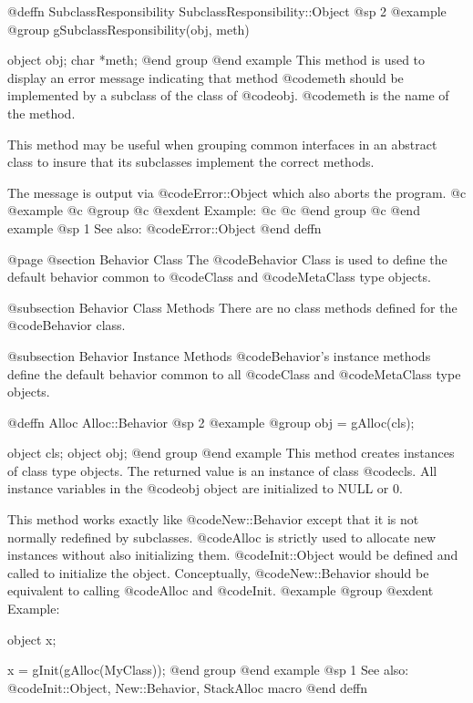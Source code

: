 @deffn {SubclassResponsibility} SubclassResponsibility::Object
@sp 2
@example
@group
gSubclassResponsibility(obj, meth)

object  obj;
char    *meth;
@end group
@end example
This method is used to display an error message indicating that method
@code{meth} should be implemented by a subclass of the class of
@code{obj}.  @code{meth} is the name of the method.

This method may be useful when grouping common interfaces in an
abstract class to insure that its subclasses implement the correct
methods.

The message is output via @code{Error::Object} which also aborts the
program.
@c @example
@c @group
@c @exdent Example:
@c 
@c @end group
@c @end example
@sp 1
See also:  @code{Error::Object}
@end deffn










@page
@section Behavior Class
The @code{Behavior} Class is used to define the default behavior
common to @code{Class} and @code{MetaClass} type objects.

@subsection Behavior Class Methods
There are no class methods defined for the @code{Behavior} class.

@subsection Behavior Instance Methods
@code{Behavior}'s instance methods define the default behavior common to all
@code{Class} and @code{MetaClass} type objects.





@deffn {Alloc} Alloc::Behavior
@sp 2
@example
@group
obj = gAlloc(cls);

object  cls;
object  obj;
@end group
@end example
This method creates instances of class type objects.  The
returned value is an instance of class @code{cls}.  All instance
variables in the @code{obj} object are initialized to NULL or 0.

This method works exactly like @code{New::Behavior} except that it
is not normally redefined by subclasses.  @code{Alloc} is strictly
used to allocate new instances without also initializing them.
@code{Init::Object} would be defined and called to initialize the
object.  Conceptually, @code{New::Behavior} should be equivalent to
calling @code{Alloc} and @code{Init}.
@example
@group
@exdent Example:

object  x;

x = gInit(gAlloc(MyClass));
@end group
@end example
@sp 1
See also:  @code{Init::Object, New::Behavior, StackAlloc macro}
@end deffn






